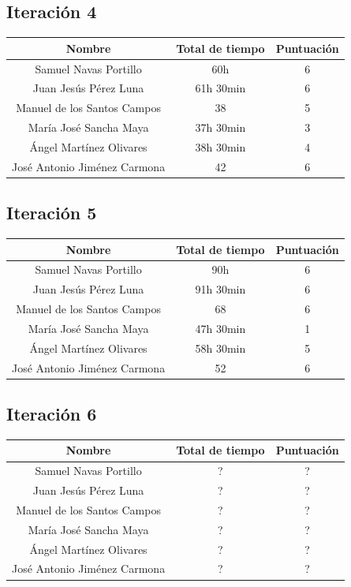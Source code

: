 \documentclass[11 pt]{book}
\begin{document}
		\subsection*{Iteración 4}			
			\begin{tabular}{|c|c|c|}
				\hline
				Nombre & Total de tiempo & Puntuación\\
				\hline
				Samuel Navas Portillo & 60h & 6\\
				Juan Jesús Pérez Luna & 61h 30min & 6\\
				Manuel de los Santos Campos & 38 & 5\\
				María José Sancha Maya & 37h 30min & 3\\
				Ángel Martínez Olivares & 38h 30min & 4\\
				José Antonio Jiménez Carmona & 42 & 6\\
				\hline
			\end{tabular}
			
		\subsection*{Iteración 5}			
			\begin{tabular}{|c|c|c|}
				\hline
				Nombre & Total de tiempo & Puntuación\\
				\hline
				Samuel Navas Portillo & 90h & 6\\
				Juan Jesús Pérez Luna & 91h 30min & 6\\
				Manuel de los Santos Campos & 68 & 6\\
				María José Sancha Maya & 47h 30min & 1\\
				Ángel Martínez Olivares & 58h 30min & 5\\
				José Antonio Jiménez Carmona & 52 & 6\\
				\hline
			\end{tabular}
			
		\subsection*{Iteración 6}			
			\begin{tabular}{|c|c|c|}
				\hline
				Nombre & Total de tiempo & Puntuación\\
				\hline
				Samuel Navas Portillo & ? & ?\\
				Juan Jesús Pérez Luna & ? & ?\\
				Manuel de los Santos Campos & ? & ?\\
				María José Sancha Maya & ? & ?\\
				Ángel Martínez Olivares & ? & ?\\
				José Antonio Jiménez Carmona & ? & ?\\
				\hline
			\end{tabular}
			
\end{document}

